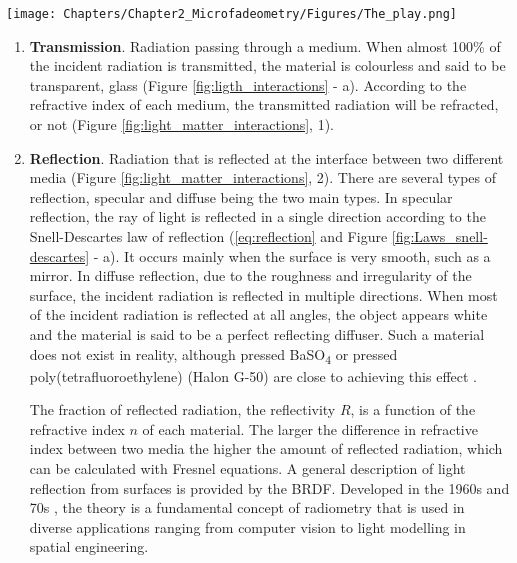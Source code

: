 \begin{figure*}[!h]
\centering
\texttt{[image: Chapters/Chapter2\_Microfadeometry/Figures/The\_play.png]}
\caption[\hspace{0.3cm}Light–matter interactions]{Light–matter interactions.}
\label{fig:light_matter_interactions}
\end{figure*}



\begin{enumerate}
    \item \textbf{Transmission}.  Radiation passing through a medium. When almost 100\% of the incident radiation is transmitted, the material is colourless and said to be transparent, \ie glass (Figure \ref{fig:ligth_interactions} - a). According to the refractive index of each medium, the transmitted radiation will be refracted, or not (Figure \ref{fig:light_matter_interactions}, 1).

    \item \textbf{Reflection}. Radiation that is reflected at the interface between two different media (Figure \ref{fig:light_matter_interactions}, 2). There are several types of reflection, specular and diffuse being the two main types. In specular reflection, the ray of light is reflected in a single direction according to the Snell-Descartes law of reflection (\ref{eq:reflection} and Figure \ref{fig:Laws_snell-descartes} - a). It occurs mainly when the surface is very smooth, such as a mirror. In diffuse reflection, due to the roughness and irregularity of the surface, the incident radiation is reflected in multiple directions. When most of the incident radiation is reflected at all angles, the object appears white and the material is said to be a perfect reflecting diffuser. Such a material does not exist in reality, although pressed BaSO\textsubscript{4} or pressed poly(tetrafluoroethylene) (Halon G-50) are close to achieving this effect \citep[11]{johnston-feller_color_2001}.

    The fraction of reflected radiation, \ie the reflectivity $R$, is a function of the refractive index $n$ of each material. The larger the difference in refractive index between two media the higher the amount of reflected radiation, which can be calculated with Fresnel equations. A general description of light reflection from surfaces is provided by the \gls{BRDF}. Developed in the 1960s and 70s \citep{nicodemus_directional_1965, nicodemus_geometrical_1977}, the theory is a fundamental concept of radiometry that is used in diverse applications ranging from computer vision to light modelling in spatial engineering. 


\end{enumerate}
